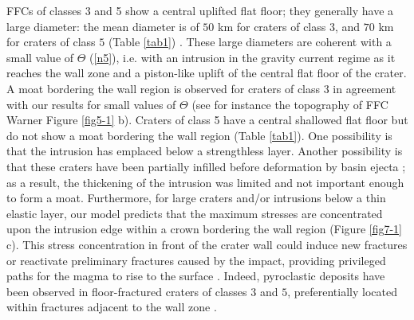 \begin{article}
	FFCs of  classes 3 and 5  show a central uplifted  flat floor;
        they generally have a large  diameter: the mean diameter is of
        $50$ km  for craters of  class 3, and  $70$ km for  craters of
        class            $5$             (Table            \ref{tab1})
        \citep{Schultz1976,Jozwiak2012}.  These  large  diameters  are
        coherent with a small value  of $\Theta$ (\ref{n5}), i.e. with
        an intrusion in  the gravity current regime as  it reaches the
        wall zone and  a piston-like uplift of the  central flat floor
        of the  crater. A moat  bordering the wall region  is observed
        for craters of class 3 in agreement with our results for small
        values of  $\Theta$ (see  for instance  the topography  of FFC
        Warner  Figure \ref{fig5-1}  b).  Craters of  class  5 have  a
        central shallowed flat floor but  do not show a moat bordering
        the wall  region (Table  \ref{tab1}). One possibility  is that
        the intrusion has emplaced below a strengthless layer. Another
        possibility is that these craters have been partially infilled
        before deformation  by basin ejecta \citep{Schultz1976};  as a
        result, the  thickening of the  intrusion was limited  and not
        important  enough  to  form  a moat.  Furthermore,  for  large
        craters  and/or intrusions  below  a thin  elastic layer,  our
        model predicts that the maximum stresses are concentrated upon
        the intrusion  edge within a  crown bordering the  wall region
        (Figure \ref{fig7-1} c). This stress concentration in front of
        the  crater  wall could  induce  new  fractures or  reactivate
        preliminary   fractures  caused   by  the   impact,  providing
        privileged  paths  for  the  magma  to  rise  to  the  surface
        \citep{Schultz1976}.  Indeed, pyroclastic  deposits have  been
        observed in  floor-fractured craters  of classes $3$  and $5$,
        preferentially located  within fractures adjacent to  the wall
        zone \citep{Schultz1976}.
	 

\end{article}
